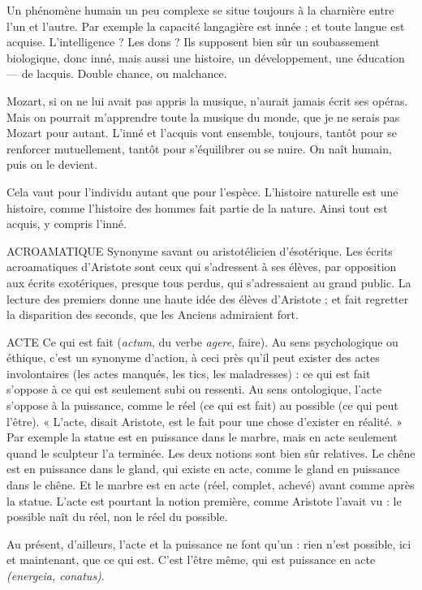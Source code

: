 Un phénomène humain un peu complexe se situe toujours à la charnière
entre l’un et l’autre. Par exemple la capacité langagière est innée ; et toute
langue est acquise. L'intelligence ? Les dons ? Ils supposent bien sûr un soubassement
biologique, donc inné, mais aussi une histoire, un développement, une
éducation — de lacquis. Double chance, ou malchance.

Mozart, si on ne lui avait pas appris la musique, n'aurait jamais écrit ses
opéras. Mais on pourrait m’apprendre toute la musique du monde, que je ne
serais pas Mozart pour autant. L’inné et l’acquis vont ensemble, toujours,
tantôt pour se renforcer mutuellement, tantôt pour s’équilibrer ou se nuire. On
naît humain, puis on le devient.

Cela vaut pour l'individu autant que pour l’espèce. L'histoire naturelle est
une histoire, comme l’histoire des hommes fait partie de la nature. Ainsi tout
est acquis, y compris l’inné.

ACROAMATIQUE Synonyme savant ou aristotélicien d’ésotérique. Les écrits
acroamatiques d’Aristote sont ceux qui s'adressent à ses
élèves, par opposition aux écrits exotériques, presque tous perdus, qui s’adressaient
au grand public. La lecture des premiers donne une haute idée des élèves
d’Aristote ; et fait regretter la disparition des seconds, que les Anciens admiraient
fort.

ACTE Ce qui est fait ({\it actum}, du verbe {\it agere}, faire). Au sens psychologique
ou éthique, c’est un synonyme d’action, à ceci près qu’il peut exister
des actes involontaires (les actes manqués, les tics, les maladresses) : ce qui est
fait s’oppose à ce qui est seulement subi ou ressenti. Au sens ontologique, l’acte
s'oppose à la puissance, comme le réel (ce qui est fait) au possible (ce qui peut
l'être). « L'acte, disait Aristote, est le fait pour une chose d'exister en réalité. »
Par exemple la statue est en puissance dans le marbre, mais en acte seulement
quand le sculpteur l’a terminée.
Les deux notions sont bien sûr relatives. Le chêne est en puissance dans le
gland, qui existe en acte, comme le gland en puissance dans le chêne. Et le
marbre est en acte (réel, complet, achevé) avant comme après la statue. L'acte
est pourtant la notion première, comme Aristote l’avait vu : le possible naît du
réel, non le réel du possible.

Au présent, d’ailleurs, l’acte et la puissance ne font qu’un : rien n’est possible,
ici et maintenant, que ce qui est. C’est l'être même, qui est puissance en
acte {\it (energeia, conatus)}.

